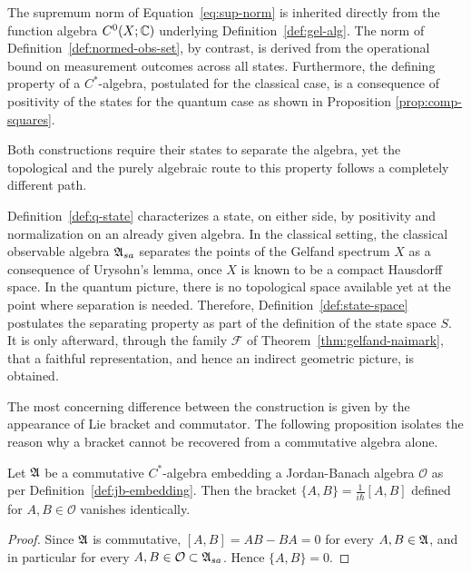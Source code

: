 	\begin{remark}
		\label{rem:concl-norm-comparison}
		The supremum norm of Equation~\eqref{eq:sup-norm} is inherited directly from the function algebra $C^0(X;\mathbb{C})$ underlying Definition~\ref{def:gel-alg}. The norm of Definition~\ref{def:normed-obs-set}, by contrast, is derived from the operational bound on measurement outcomes across all states. Furthermore, the defining property of a $C^*$-algebra, postulated for the classical case, is a consequence of positivity of the states for the quantum case as shown in Proposition \ref{prop:comp-squares}.
	\end{remark}
	
	\noindent Both constructions require their states to separate the algebra, yet the topological and the purely algebraic route to this property follows a completely different path.
	
	\begin{remark}
		\label{rem:concl-states-comparison}
		Definition~\ref{def:q-state} characterizes a state, on either side, by positivity and normalization on an already given algebra. In the classical setting, the classical observable algebra $\mathfrak{A}_{sa}$ separates the points of the Gelfand spectrum $X$ as a consequence of Urysohn's lemma, once $X$ is known to be a compact Hausdorff space. In the quantum picture, there is no topological space available yet at the point where separation is needed. Therefore, Definition~\ref{def:state-space} postulates the separating property as part of the definition of the state space $S$. It is only afterward, through the family $\mathcal F$ of Theorem~\ref{thm:gelfand-naimark}, that a faithful representation, and hence an indirect geometric picture, is obtained.
	\end{remark}
	
	\noindent The most concerning difference between the construction is given by the appearance of Lie bracket and commutator. The following proposition isolates the reason why a bracket cannot be recovered from a commutative algebra alone.
	
	\begin{proposition}
		\label{prop:concl-bracket-vanishes}
		Let $\mathfrak{A}$ be a commutative $C^*$-algebra embedding a Jordan-Banach algebra $\mathcal{O}$ as per Definition~\ref{def:jb-embedding}. Then the bracket $\{A,B\}=\frac{1}{i\hbar}[A,B]$ defined for $A,B\in\mathcal{O}$ vanishes identically.
	\end{proposition}
	\begin{proof}
		Since $\mathfrak{A}$ is commutative, $[A,B]=AB-BA=0$ for every $A,B\in\mathfrak{A}$, and in particular for every $A,B\in\mathcal{O}\subset\A_{sa}$. Hence $\{A,B\}=0$.
	\end{proof}
	
